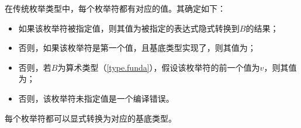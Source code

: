 \pnum
在传统枚举类型中，每个枚举符都有对应的值。其确定如下：

\begin{itemize}
    \item 如果该枚举符被指定值，则其值为被指定的表达式隐式转换到$B$的结果；
    \item 否则，如果该枚举符是第一个值，且基底类型实现了，则其值为；
    \item 否则，若$B$为算术类型（\ref{type.funda}），假设该枚举符的前一个值为$v$，则其值为；
    \item 否则，该枚举符未指定值是一个编译错误。
\end{itemize}

每个枚举符都可以显式转换为对应的基底类型。

